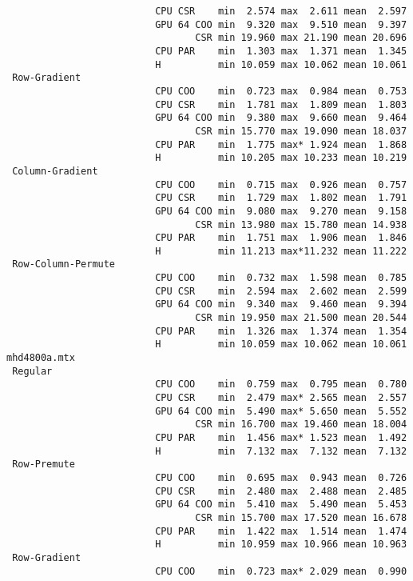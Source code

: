 {\begin{verbatim}
                          CPU CSR    min  2.574 max  2.611 mean  2.597
                          GPU 64 COO min  9.320 max  9.510 mean  9.397
                                 CSR min 19.960 max 21.190 mean 20.696
                          CPU PAR    min  1.303 max  1.371 mean  1.345
                          H          min 10.059 max 10.062 mean 10.061
 Row-Gradient
                          CPU COO    min  0.723 max  0.984 mean  0.753
                          CPU CSR    min  1.781 max  1.809 mean  1.803
                          GPU 64 COO min  9.380 max  9.660 mean  9.464
                                 CSR min 15.770 max 19.090 mean 18.037
                          CPU PAR    min  1.775 max* 1.924 mean  1.868
                          H          min 10.205 max 10.233 mean 10.219
 Column-Gradient
                          CPU COO    min  0.715 max  0.926 mean  0.757
                          CPU CSR    min  1.729 max  1.802 mean  1.791
                          GPU 64 COO min  9.080 max  9.270 mean  9.158
                                 CSR min 13.980 max 15.780 mean 14.938
                          CPU PAR    min  1.751 max  1.906 mean  1.846
                          H          min 11.213 max*11.232 mean 11.222
 Row-Column-Permute
                          CPU COO    min  0.732 max  1.598 mean  0.785
                          CPU CSR    min  2.594 max  2.602 mean  2.599
                          GPU 64 COO min  9.340 max  9.460 mean  9.394
                                 CSR min 19.950 max 21.500 mean 20.544
                          CPU PAR    min  1.326 max  1.374 mean  1.354
                          H          min 10.059 max 10.062 mean 10.061
mhd4800a.mtx
 Regular
                          CPU COO    min  0.759 max  0.795 mean  0.780
                          CPU CSR    min  2.479 max* 2.565 mean  2.557
                          GPU 64 COO min  5.490 max* 5.650 mean  5.552
                                 CSR min 16.700 max 19.460 mean 18.004
                          CPU PAR    min  1.456 max* 1.523 mean  1.492
                          H          min  7.132 max  7.132 mean  7.132
 Row-Premute
                          CPU COO    min  0.695 max  0.943 mean  0.726
                          CPU CSR    min  2.480 max  2.488 mean  2.485
                          GPU 64 COO min  5.410 max  5.490 mean  5.453
                                 CSR min 15.700 max 17.520 mean 16.678
                          CPU PAR    min  1.422 max  1.514 mean  1.474
                          H          min 10.959 max 10.966 mean 10.963
 Row-Gradient
                          CPU COO    min  0.723 max* 2.029 mean  0.990

\end{verbatim}}
